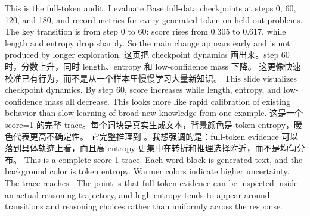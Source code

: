 {}\markdownRendererInterblockSeparator
{}This is the full-token audit. I evaluate Base full-data checkpoints at steps 0, 60, 120, and 180, and record metrics for every generated token on held-out problems.\markdownRendererInterblockSeparator
{}The key transition is from step 0 to 60: score rises from 0.305 to 0.617, while length and entropy drop sharply. So the main change appears early and is not produced by longer exploration.\markdownRendererInterblockSeparator
{}\markdownRendererHorizontalRule{}\markdownRendererInterblockSeparator
{}\markdownRendererInterblockSeparator
{}\markdownRendererInterblockSeparator
{}这页把 checkpoint dynamics 画出来。step 60 时，分数上升，同时 length、entropy 和 low-confidence mass 下降。\markdownRendererInterblockSeparator
{}这更像快速校准已有行为，而不是从一个样本里慢慢学习大量新知识。\markdownRendererInterblockSeparator
{}\markdownRendererInterblockSeparator
{}This slide visualizes checkpoint dynamics. By step 60, score increases while length, entropy, and low-confidence mass all decrease.\markdownRendererInterblockSeparator
{}This looks more like rapid calibration of existing behavior than slow learning of broad new knowledge from one example.\markdownRendererInterblockSeparator
{}\markdownRendererHorizontalRule{}\markdownRendererInterblockSeparator
{}\markdownRendererInterblockSeparator
{}\markdownRendererInterblockSeparator
{}这是一个 score=1 的完整 trace。每个词块是真实生成文本，背景颜色是 token entropy，暖色代表更高不确定性。\markdownRendererInterblockSeparator
{}它完整推理到 。我想强调的是：full-token evidence 可以落到具体轨迹上看，而且高 entropy 更集中在转折和推理选择附近，而不是均匀分布。\markdownRendererInterblockSeparator
{}\markdownRendererInterblockSeparator
{}This is a complete score-1 trace. Each word block is generated text, and the background color is token entropy. Warmer colors indicate higher uncertainty.\markdownRendererInterblockSeparator
{}The trace reaches . The point is that full-token evidence can be inspected inside an actual reasoning trajectory, and high entropy tends to appear around transitions and reasoning choices rather than uniformly across the response.\markdownRendererInterblockSeparator
